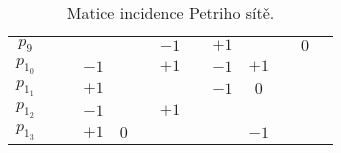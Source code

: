 \begin{table}[h!]
{\begin{tabular}{c|c|c|c|c|c|c|c|c|c|c|c|c|}
            \textbf{$p_9$}   & $  $ & $  $ & $  $ & $  $ & $  $ & $-1$ & $  $ & $+1$ & $  $ & $  $ & $ 0$ & $  $ \\
            \textbf{$p_1_0$} & $  $ & $  $ & $-1$ & $  $ & $  $ & $+1$ & $  $ & $-1$ & $+1$ & $  $ & $  $ & $  $ \\
            \textbf{$p_1_1$} & $  $ & $  $ & $+1$ & $  $ & $  $ & $  $ & $  $ & $-1$ & $ 0$ & $  $ & $  $ & $  $ \\
            \textbf{$p_1_2$} & $  $ & $  $ & $-1$ & $  $ & $  $ & $+1$ & $  $ & $  $ & $  $ & $  $ & $  $ & $  $ \\
            \textbf{$p_1_3$} & $  $ & $  $ & $+1$ & $ 0$ & $  $ & $  $ & $  $ & $  $ & $-1$ & $  $ & $  $ & $  $ \\
        \end{tabular}
    }
    \caption{Matice incidence Petriho sítě. \footnotemark}
    \label{tab:transitions}
\end{table}


\endinput